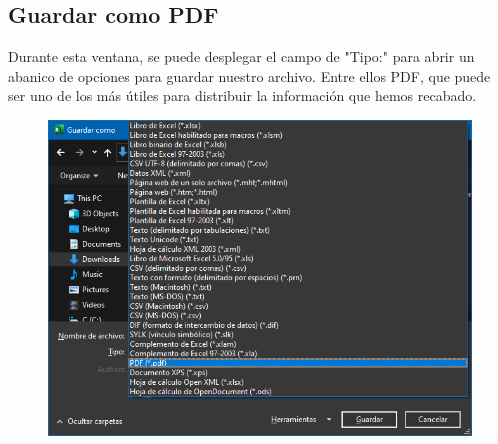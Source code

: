 \documentclass[12pt,a4paper]{book}
\begin{document}
\subsection{Guardar como PDF}
Durante esta ventana, se puede desplegar el campo de "Tipo:" para abrir un abanico de opciones para guardar nuestro archivo. Entre ellos PDF, que puede ser uno de los más útiles para distribuir la información que hemos recabado.
\begin{figure}[h]
	\centering
    \includegraphics[width=13cm]{excel16}
\end{figure}
\end{document}
